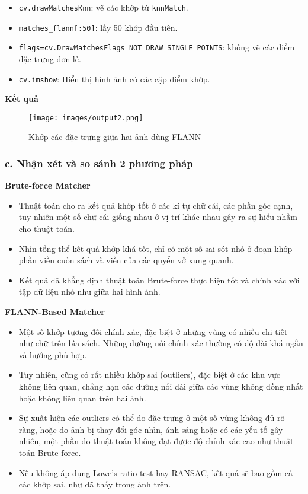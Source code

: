 \begin{itemize}
	\item \texttt{cv.drawMatchesKnn}: vẽ các khớp từ \texttt{knnMatch}.
	\item \texttt{matches\_flann[:50]}: lấy 50 khớp đầu tiên.
	\item \texttt{flags=cv.DrawMatchesFlags\_NOT\_DRAW\_SINGLE\_POINTS}: không vẽ các điểm đặc trưng đơn lẻ.
	
	\item \texttt{cv.imshow}: Hiển thị hình ảnh có các cặp điểm khớp.
\end{itemize}

\textbf{Kết quả}

\begin{figure}[H]
	\centering
	\texttt{[image: images/output2.png]}
	\caption{Khớp các đặc trưng giữa hai ảnh dùng FLANN}
\end{figure}


\subsubsection*{c. Nhận xét và so sánh 2 phương pháp}
\textbf{Brute-force Matcher}
\begin{itemize}
	\item Thuật toán cho ra kết quả khớp tốt ở các kí tự chữ cái, các phần góc cạnh, tuy nhiên một số chữ cái giống nhau ở vị trí khác nhau gây ra sự hiểu nhầm cho thuật toán.
	\item Nhìn tổng thể kết quả khớp khá tốt, chỉ có một số sai sót nhỏ ở đoạn khớp phần viền cuốn sách và viền của các quyển vở xung quanh.
	\item Kết quả đã khẳng định thuật toán Brute-force thực hiện tốt và chính xác với tập dữ liệu nhỏ như giữa hai hình ảnh.
\end{itemize}
\textbf{FLANN-Based Matcher}
\begin{itemize}
	\item Một số khớp tương đối chính xác, đặc biệt ở những vùng có nhiều chi tiết như chữ trên bìa sách. Những đường nối chính xác thường có độ dài khá ngắn và hướng phù hợp.
	\item Tuy nhiên, cũng có rất nhiều khớp sai (outliers), đặc biệt ở các khu vực không liên quan, chẳng hạn các đường nối dài giữa các vùng không đồng nhất hoặc không liên quan trên hai ảnh.
	\item Sự xuất hiện các outliers có thể do đặc trưng ở một số vùng không đủ rõ ràng, hoặc do ảnh bị thay đổi góc nhìn, ánh sáng hoặc có các yếu tố gây nhiễu, một phần do thuật toán không đạt được độ chính xác cao như thuật toán Brute-force.
	\item Nếu không áp dụng Lowe's ratio test hay RANSAC, kết quả sẽ bao gồm cả các khớp sai, như đã thấy trong ảnh trên.
\end{itemize}

